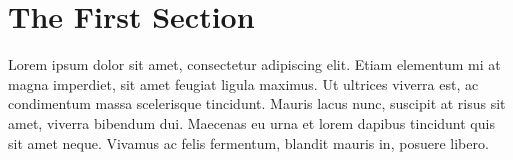 \documentclass[onecolumn, draftclsnofoot,10pt, compsoc]{IEEEtran}
\begin{document}
\section{The First Section}
Lorem ipsum dolor sit amet, consectetur adipiscing elit. 
Etiam elementum mi at magna imperdiet, sit amet feugiat ligula maximus. 
Ut ultrices viverra est, ac condimentum massa scelerisque tincidunt. 
Mauris lacus nunc, suscipit at risus sit amet, viverra bibendum dui. 
Maecenas eu urna et lorem dapibus tincidunt quis sit amet neque. 
Vivamus ac felis fermentum, blandit mauris in, posuere libero. 
\end{document}
